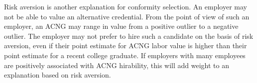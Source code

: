 \documentclass[review]{elsarticle}
\begin{document}
Risk aversion is another explanation for conformity selection.
An employer may not be able to value an alternative credential.
From the point of view of such an employer, an ACNG may range in value from a positive outlier to a negative outlier.
The employer may not prefer to hire such a candidate on the basis of risk aversion,
even if their point estimate for ACNG labor value is higher than their point estimate for a recent college graduate.
If employers with many employees are positively associated with ACNG hirability, this will add weight to an explanation based on risk aversion.
\end{document}
